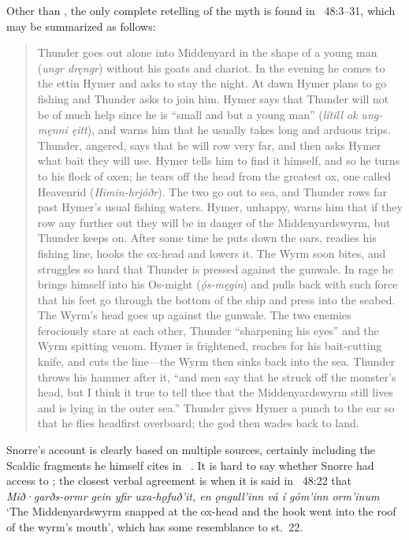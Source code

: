 Other than , the only complete retelling of the myth is found in \Gylfaginning~48:3--31, which may be summarized as follows:

\begin{quote}{\small Thunder goes out alone into Middenyard in the shape of a young man (\emph{ungr dręngr}) without his goats and chariot.  In the evening he comes to the ettin Hymer and asks to stay the night.  At dawn Hymer plans to go fishing and Thunder asks to join him.  Hymer says that Thunder will not be of much help since he is “small and but a young man” (\emph{lítill ok ung-męnni ęitt}), and warns him that he usually takes long and arduous trips.  Thunder, angered, says that he will row very far, and then asks Hymer what bait they will use.  Hymer tells him to find it himself, and so he turns to his flock of oxen; he tears off the head from the greatest ox, one called Heavenrid (\emph{Himin-hrjóðr}).
The two go out to sea, and Thunder rows far past Hymer’s usual fishing waters.  Hymer, unhappy, warns him that if they row any further out they will be in danger of the Middenyardswyrm, but Thunder keeps on.  After some time he puts down the oars, readies his fishing line, hooks the ox-head and lowers it.  The Wyrm soon bites, and struggles so hard that Thunder is pressed against the gunwale.  In rage he brings himself into his Os-might (\emph{ǫ́s-męgin}) and pulls back with such force that his feet go through the bottom of the ship and press into the seabed.  The Wyrm’s head goes up against the gunwale.  The two enemies ferociously stare at each other, Thunder “sharpening his eyes” and the Wyrm spitting venom.  Hymer is frightened, reaches for his bait-cutting knife, and cuts the line---the Wyrm then sinks back into the sea.  Thunder throws his hammer after it, “and men say that he struck off the monster’s head, but I think it true to tell thee that the Middenyardswyrm still lives and is lying in the outer sea.”  Thunder gives Hymer a punch to the ear so that he flies headfirst overboard; the god then wades back to land.}\end{quote}

Snorre’s account is clearly based on multiple sources, certainly including the Scaldic fragments he himself cites in \Skaldskaparmal\ \parencite[1068--1070]{Lindow2020Thorr}.  It is hard to say whether Snorre had access to \Hymiskvida; the closest verbal agreement is when it is said in \Gylfaginning~48:22 that \emph{Mið·garðs-ormr gein yfir uxa-hǫfuð’it, en ǫngull’inn vá í góm’inn orm’inum} ‘The Middenyardswyrm snapped at the ox-head and the hook went into the roof of the wyrm’s mouth’, which has some resemblance to st.~22.

